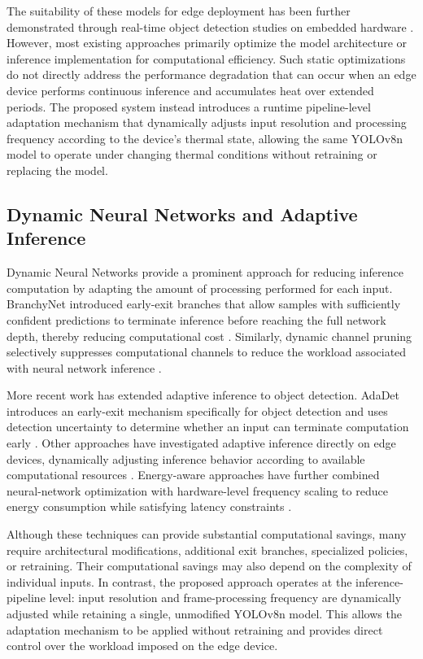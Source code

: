 \documentclass{ieeeaccess}
\begin{document}
The suitability of these models for edge deployment has been further demonstrated through real-time object detection studies on embedded hardware \cite{b13,b14}. However, most existing approaches primarily optimize the model architecture or inference implementation for computational efficiency. Such static optimizations do not directly address the performance degradation that can occur when an edge device performs continuous inference and accumulates heat over extended periods. The proposed system instead introduces a runtime pipeline-level adaptation mechanism that dynamically adjusts input resolution and processing frequency according to the device's thermal state, allowing the same YOLOv8n model to operate under changing thermal conditions without retraining or replacing the model.

\subsection{Dynamic Neural Networks and Adaptive Inference}

Dynamic Neural Networks provide a prominent approach for reducing inference computation by adapting the amount of processing performed for each input. BranchyNet introduced early-exit branches that allow samples with sufficiently confident predictions to terminate inference before reaching the full network depth, thereby reducing computational cost \cite{b23}. Similarly, dynamic channel pruning selectively suppresses computational channels to reduce the workload associated with neural network inference \cite{b21}.

More recent work has extended adaptive inference to object detection. AdaDet introduces an early-exit mechanism specifically for object detection and uses detection uncertainty to determine whether an input can terminate computation early \cite{b17}. Other approaches have investigated adaptive inference directly on edge devices, dynamically adjusting inference behavior according to available computational resources \cite{b18}. Energy-aware approaches have further combined neural-network optimization with hardware-level frequency scaling to reduce energy consumption while satisfying latency constraints \cite{b8}.

Although these techniques can provide substantial computational savings, many require architectural modifications, additional exit branches, specialized policies, or retraining. Their computational savings may also depend on the complexity of individual inputs. In contrast, the proposed approach operates at the inference-pipeline level: input resolution and frame-processing frequency are dynamically adjusted while retaining a single, unmodified YOLOv8n model. This allows the adaptation mechanism to be applied without retraining and provides direct control over the workload imposed on the edge device.
\end{document}
